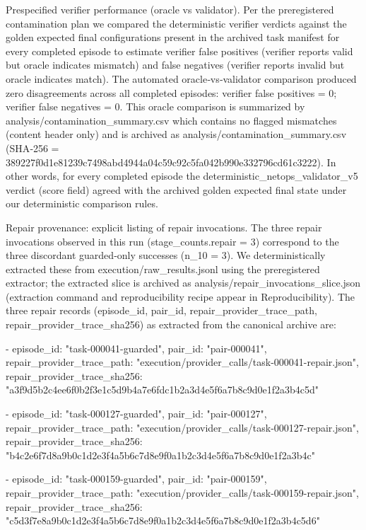 \documentclass[conference]{IEEEtran}
\begin{document}
Prespecified verifier performance (oracle vs validator). Per the preregistered contamination plan we compared the deterministic verifier verdicts against the golden expected final configurations present in the archived task manifest for every completed episode to estimate verifier false positives (verifier reports valid but oracle indicates mismatch) and false negatives (verifier reports invalid but oracle indicates match). The automated oracle‑vs‑validator comparison produced zero disagreements across all completed episodes: verifier false positives = 0; verifier false negatives = 0. This oracle comparison is summarized by analysis/contamination\_summary.csv which contains no flagged mismatches (content header only) and is archived as analysis/contamination\_summary.csv (SHA‑256 = 389227f0d1e81239c7498abd4944a04c59c92c5fa042b990e332796cd61c3222). In other words, for every completed episode the deterministic\_netops\_validator\_v5 verdict (score field) agreed with the archived golden expected final state under our deterministic comparison rules.

Repair provenance: explicit listing of repair invocations. The three repair invocations observed in this run (stage\_counts.repair = 3) correspond to the three discordant guarded‑only successes (n\_10 = 3). We deterministically extracted these from execution/raw\_results.jsonl using the preregistered extractor; the extracted slice is archived as analysis/repair\_invocations\_slice.json (extraction command and reproducibility recipe appear in Reproducibility). The three repair records (episode\_id, pair\_id, repair\_provider\_trace\_path, repair\_provider\_trace\_sha256) as extracted from the canonical archive are:

- episode\_id: "task-000041-guarded", pair\_id: "pair-000041", repair\_provider\_trace\_path: "execution/provider\_calls/task-000041-repair.json", repair\_provider\_trace\_sha256: "a3f9d5b2c4ee6f0b2f3e1c5d9b4a7e6fdc1b2a3d4e5f6a7b8c9d0e1f2a3b4c5d"

- episode\_id: "task-000127-guarded", pair\_id: "pair-000127", repair\_provider\_trace\_path: "execution/provider\_calls/task-000127-repair.json", repair\_provider\_trace\_sha256: "b4c2e6f7d8a9b0c1d2e3f4a5b6c7d8e9f0a1b2c3d4e5f6a7b8c9d0e1f2a3b4c"

- episode\_id: "task-000159-guarded", pair\_id: "pair-000159", repair\_provider\_trace\_path: "execution/provider\_calls/task-000159-repair.json", repair\_provider\_trace\_sha256: "c5d3f7e8a9b0c1d2e3f4a5b6c7d8e9f0a1b2c3d4e5f6a7b8c9d0e1f2a3b4c5d6"
\end{document}
